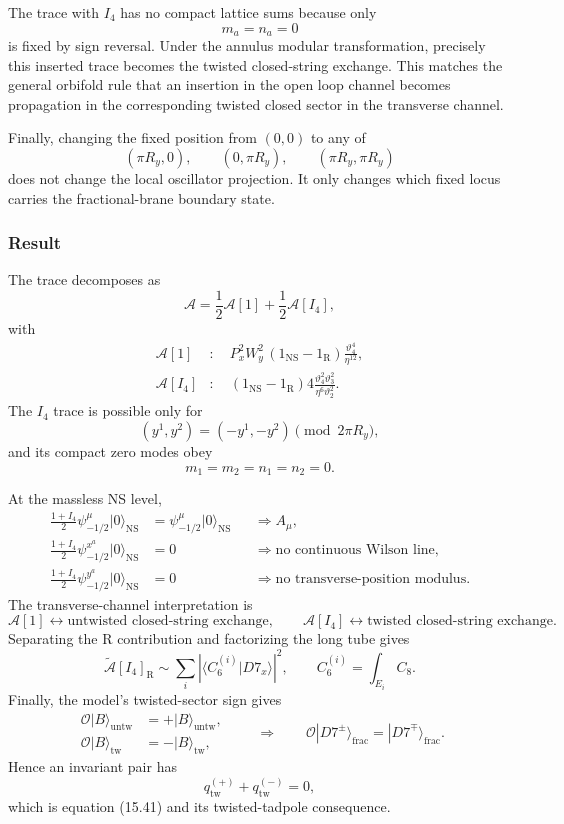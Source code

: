 \documentclass[
  10pt,
  a4paper,
  openany]{book}
\begin{document}
The trace with \(I_4\) has no compact lattice sums because only \[
m_a=n_a=0
\] is fixed by sign reversal. Under the annulus modular transformation,
precisely this inserted trace becomes the twisted closed-string
exchange. This matches the general orbifold rule that an insertion in
the open loop channel becomes propagation in the corresponding twisted
closed sector in the transverse channel.

Finally, changing the fixed position from \((0,0)\) to any of \[
(\pi R_y,0),
\qquad
(0,\pi R_y),
\qquad
(\pi R_y,\pi R_y)
\] does not change the local oscillator projection. It only changes
which fixed locus carries the fractional-brane boundary state.

\subsubsection{Result}\label{result-26}

The trace decomposes as \[
\boxed{
\mathcal A
=
\frac12\mathcal A[1]
+
\frac12\mathcal A[I_4],
}
\] with \[
\boxed{
\begin{aligned}
\mathcal A[1]
&:
\quad
P_x^2W_y^2\,
(1_{\mathrm{NS}}-1_{\mathrm R})
\frac{\vartheta_4^4}{\eta^{12}},\\
\mathcal A[I_4]
&:
\quad
(1_{\mathrm{NS}}-1_{\mathrm R})
4\frac{\vartheta_4^2\vartheta_3^2}
{\eta^6\vartheta_2^2}.
\end{aligned}
}
\] The \(I_4\) trace is possible only for \[
(y^1,y^2)
=
(-y^1,-y^2)
\pmod{2\pi R_y},
\] and its compact zero modes obey \[
m_1=m_2=n_1=n_2=0.
\]

At the massless NS level, \[
\boxed{
\begin{aligned}
\frac{1+I_4}{2}
\psi_{-1/2}^{\mu}|0\rangle_{\mathrm{NS}}
&=
\psi_{-1/2}^{\mu}|0\rangle_{\mathrm{NS}}
&&\Longrightarrow A_\mu,\\
\frac{1+I_4}{2}
\psi_{-1/2}^{x^a}|0\rangle_{\mathrm{NS}}
&=
0
&&\Longrightarrow\text{no continuous Wilson line},\\
\frac{1+I_4}{2}
\psi_{-1/2}^{y^a}|0\rangle_{\mathrm{NS}}
&=
0
&&\Longrightarrow\text{no transverse-position modulus}.
\end{aligned}
}
\] The transverse-channel interpretation is \[
\boxed{
\mathcal A[1]
\longleftrightarrow
\text{untwisted closed-string exchange},
\qquad
\mathcal A[I_4]
\longleftrightarrow
\text{twisted closed-string exchange}.
}
\] Separating the R contribution and factorizing the long tube gives \[
\boxed{
\widetilde{\mathcal A}[I_4]_{\mathrm R}
\sim
\sum_i
\left|
\langle C_6^{(i)}|D7_x\rangle
\right|^2,
\qquad
C_6^{(i)}
=
\int_{E_i}C_8.
}
\] Finally, the model's twisted-sector sign gives \[
\boxed{
\begin{aligned}
\mathcal O|B\rangle_{\mathrm{untw}}
&=
+|B\rangle_{\mathrm{untw}},\\
\mathcal O|B\rangle_{\mathrm{tw}}
&=
-|B\rangle_{\mathrm{tw}},
\end{aligned}
\qquad
\Longrightarrow
\qquad
\mathcal O|D7^\pm\rangle_{\mathrm{frac}}
=
|D7^\mp\rangle_{\mathrm{frac}}.
}
\] Hence an invariant pair has \[
\boxed{
q_{\mathrm{tw}}^{(+)}
+
q_{\mathrm{tw}}^{(-)}
=
0,
}
\] which is equation (15.41) and its twisted-tadpole consequence.
\end{document}
